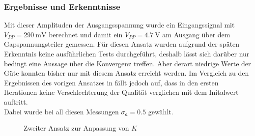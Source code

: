 \documentclass[../Report.tex]{subfiles}
\begin{document}
\subsubsection*{Ergebnisse und Erkenntnisse}
\label{subsubsec:opt.adjusta.kleiner.results}
Mit dieser Amplituden der Ausgangsspannung wurde ein Eingangssignal mit $V_{PP} = \SI{290}{\mV}$ berechnet und damit ein $V_{PP} = \SI{4.7}{\V}$ am Ausgang über dem Gapspannungsteiler gemessen. Für diesen Ansatz wurden aufgrund der späten Erkenntnis keine ausführlichen Tests durchgeführt, deshalb lässt sich darüber nur bedingt eine Aussage über die Konvergenz treffen. Aber derart niedrige Werte der Güte konnten bisher nur mit diesem Ansatz erreicht werden. Im Vergleich zu den Ergebnissen des vorigen Ansatzes in  fällt jedoch auf, dass in den ersten Iterationen keine Verschlechterung der Qualität verglichen mit dem Initalwert auftritt.
\\
Dabei wurde bei all diesen Messungen $\sigma_a = 0.5$ gewählt.
\begin{figure}[H]
\begin{subfigure}{0.5 \textwidth}
	\setlength\figureheight{7.5cm}
	\setlength\figurewidth{7.5cm}
    
	\label{fig:opt.kleinerBereich.K}
\end{subfigure}
\begin{subfigure}{0.5 \textwidth}
	\setlength\figureheight{7.5cm}
	\setlength\figurewidth{7.5cm}
    
	\label{fig:opt.kleinerBereich.Q}
\end{subfigure}
\label{fig:opt.Kennlinie}
\caption{Zweiter Ansatz zur Anpassung von $K$}
\end{figure}
\end{document}
